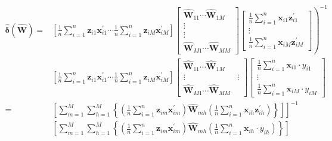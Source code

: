 \documentclass[10pt]{article}
\begin{document}
\begin{align*}
\hat{\boldsymbol{\delta}}(\widehat{\mathbf{W}})= & {\left.\left[\frac{1}{n} \sum_{i=1}^{n} \mathbf{z}_{i 1} \mathbf{x}_{i 1}^{\prime} \cdots \frac{1}{n} \sum_{i=1}^{n} \mathbf{z}_{i M} \mathbf{x}_{i M}^{\prime}\right]\left[\begin{array}{c}
\widehat{\mathbf{W}}_{11} \cdots \widehat{\mathbf{W}}_{1 M} \\
\vdots \\
\vdots \\
\widehat{\mathbf{W}}_{M 1} \cdots \widehat{\mathbf{W}}_{M M}
\end{array}\right]\left[\begin{array}{c}
\frac{1}{n} \sum_{i=1}^{n} \mathbf{x}_{i 1} \mathbf{z}_{i 1}^{\prime} \\
\vdots \\
\frac{1}{n} \sum_{i=1}^{n} \mathbf{x}_{i M} \mathbf{z}_{i M}^{\prime}
\end{array}\right]\right)^{-1} } \\
& {\left[\frac{1}{n} \sum_{i=1}^{n} \mathbf{z}_{i 1} \mathbf{x}_{i 1}^{\prime} \cdots \frac{1}{n} \sum_{i=1}^{n} \mathbf{z}_{i M} \mathbf{x}_{i M}^{\prime}\right]\left[\begin{array}{cc}
\widehat{\mathbf{W}}_{11} \cdots \widehat{\mathbf{W}}_{1 M} \\
\vdots & \vdots \\
\widehat{\mathbf{W}}_{M 1} \cdots \widehat{\mathbf{W}}_{M M}
\end{array}\right]\left[\begin{array}{c}
\frac{1}{n} \sum_{i=1}^{n} \mathbf{x}_{i 1} \cdot y_{i 1} \\
\vdots \\
\frac{1}{n} \sum_{i=1}^{n} \mathbf{x}_{i M} \cdot y_{i M}
\end{array}\right] } \\
= & {\left.\left[\sum_{m=1}^{M} \sum_{h=1}^{M}\left\{\left(\frac{1}{n} \sum_{i=1}^{n} \mathbf{z}_{i m} \mathbf{x}_{i m}^{\prime}\right) \widehat{\mathbf{W}}_{m h}\left(\frac{1}{n} \sum_{i=1}^{n} \mathbf{x}_{i h} \mathbf{z}_{i h}^{\prime}\right)\right\}\right]\right]^{-1} } \\
& {\left[\sum_{m=1}^{M} \sum_{h=1}^{M}\left\{\left(\frac{1}{n} \sum_{i=1}^{n} \mathbf{z}_{i m} \mathbf{x}_{i m}^{\prime}\right) \widehat{\mathbf{W}}_{m h}\left(\frac{1}{n} \sum_{i=1}^{n} \mathbf{x}_{i h} \cdot y_{i h}\right)\right\}\right] } \tag{4.6.6}
\end{align*}
\end{document}
